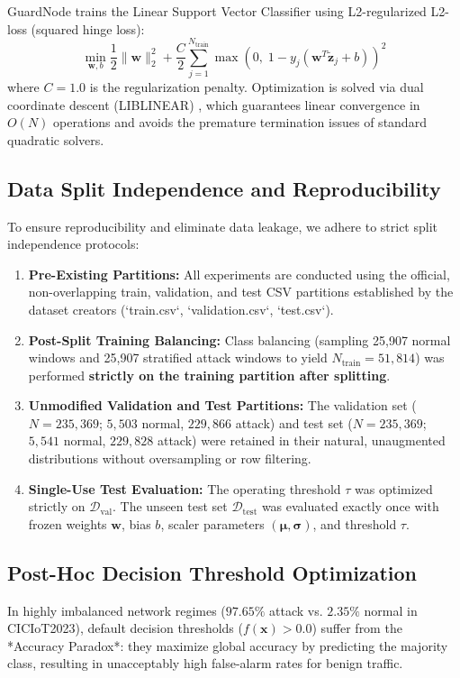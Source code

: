 \documentclass[conference]{IEEEtran}
\begin{document}
GuardNode trains the Linear Support Vector Classifier using L2-regularized L2-loss (squared hinge loss):
\begin{equation}
\min_{\mathbf{w}, b} \frac{1}{2} \|\mathbf{w}\|_2^2 + \frac{C}{2} \sum_{j=1}^{N_{\text{train}}} \max\left(0, \; 1 - y_j (\mathbf{w}^T \tilde{\mathbf{z}}_j + b)\right)^2
\end{equation}
where $C = 1.0$ is the regularization penalty. Optimization is solved via dual coordinate descent (LIBLINEAR) \cite{ref_liblinear}, which guarantees linear convergence in $O(N)$ operations and avoids the premature termination issues of standard quadratic solvers.

\subsection{Data Split Independence and Reproducibility}
To ensure reproducibility and eliminate data leakage, we adhere to strict split independence protocols:
\begin{enumerate}
    \item \textbf{Pre-Existing Partitions:} All experiments are conducted using the official, non-overlapping train, validation, and test CSV partitions established by the dataset creators \cite{ref_ciciot2023} (`train.csv`, `validation.csv`, `test.csv`).
    \item \textbf{Post-Split Training Balancing:} Class balancing (sampling 25,907 normal windows and 25,907 stratified attack windows to yield $N_{\text{train}} = 51,814$) was performed \textbf{strictly on the training partition after splitting}.
    \item \textbf{Unmodified Validation and Test Partitions:} The validation set ($N = 235,369$; $5,503$ normal, $229,866$ attack) and test set ($N = 235,369$; $5,541$ normal, $229,828$ attack) were retained in their natural, unaugmented distributions without oversampling or row filtering.
    \item \textbf{Single-Use Test Evaluation:} The operating threshold $\tau$ was optimized strictly on $\mathcal{D}_{\text{val}}$. The unseen test set $\mathcal{D}_{\text{test}}$ was evaluated exactly once with frozen weights $\mathbf{w}$, bias $b$, scaler parameters $(\boldsymbol{\mu}, \boldsymbol{\sigma})$, and threshold $\tau$.
\end{enumerate}

\subsection{Post-Hoc Decision Threshold Optimization}
In highly imbalanced network regimes ($97.65\%$ attack vs. $2.35\%$ normal in CICIoT2023), default decision thresholds ($f(\mathbf{x}) > 0.0$) suffer from the *Accuracy Paradox*: they maximize global accuracy by predicting the majority class, resulting in unacceptably high false-alarm rates for benign traffic.
\end{document}
